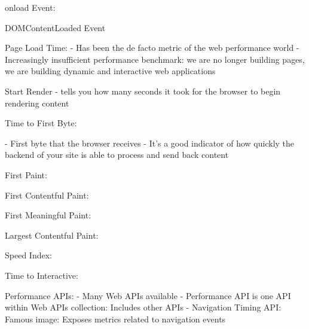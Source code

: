 onload Event: %


DOMContentLoaded Event %




Page Load Time: %
- Has been the de facto metric of the web performance world
- Increasingly insufficient performance benchmark: we are no longer building pages, we are building dynamic and interactive web applications




Start Render %
- tells you how many seconds it took for the browser to begin rendering content


Time to First Byte: %

- First byte that the browser receives
- It’s a good indicator of how quickly the backend of your site is able to process and send back content








First Paint: %


First Contentful Paint: %


First Meaningful Paint: %


Largest Contentful Paint: %


Speed Index: %


Time to Interactive: %













Performance APIs:
- Many Web APIs available %
- Performance API is one API within Web APIs collection: Includes other APIs
- Navigation Timing API: Famous image: Exposes metrics related to navigation events

